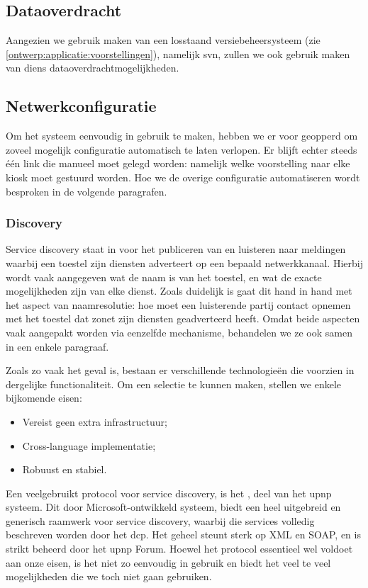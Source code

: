 \subsection{Dataoverdracht}

Aangezien we gebruik maken van een losstaand versiebeheersysteem (zie \ref{ontwerp:applicatie:voorstellingen}), namelijk \ac{svn}, zullen we ook gebruik maken van diens dataoverdrachtmogelijkheden.

\subsection{Netwerkconfiguratie}

Om het systeem eenvoudig in gebruik te maken, hebben we er voor geopperd om zoveel mogelijk configuratie automatisch te laten verlopen. Er blijft echter steeds één link die manueel moet gelegd worden: namelijk welke voorstelling naar elke kiosk moet gestuurd worden. Hoe we de overige configuratie automatiseren wordt besproken in de volgende paragrafen.

\subsubsection{Discovery}

Service discovery staat in voor het publiceren van en luisteren naar meldingen waarbij een toestel zijn diensten adverteert op een bepaald netwerkkanaal. Hierbij wordt vaak aangegeven wat de naam is van het toestel, en wat de exacte mogelijkheden zijn van elke dienst. Zoals duidelijk is gaat dit hand in hand met het aspect van naamresolutie: hoe moet een luisterende partij contact opnemen met het toestel dat zonet zijn diensten geadverteerd heeft. Omdat beide aspecten vaak aangepakt worden via eenzelfde mechanisme, behandelen we ze ook samen in een enkele paragraaf.

Zoals zo vaak het geval is, bestaan er verschillende technologieën die voorzien in dergelijke functionaliteit. Om een selectie te kunnen maken, stellen we enkele bijkomende eisen: 
\begin{itemize}
\item Vereist geen extra infrastructuur;
\item Cross-language implementatie;
\item Robuust en stabiel.
\end{itemize}

Een veelgebruikt protocol voor service discovery, is het , deel van het \ac{upnp} systeem. Dit door Microsoft-ontwikkeld systeem, biedt een heel uitgebreid en generisch raamwerk voor service discovery, waarbij die services volledig beschreven worden door het \ac{dcp}. Het geheel steunt sterk op XML en SOAP, en is strikt beheerd door het \ac{upnp} Forum. Hoewel het protocol essentieel wel voldoet aan onze eisen, is het niet zo eenvoudig in gebruik en biedt het veel te veel mogelijkheden die we toch niet gaan gebruiken.

